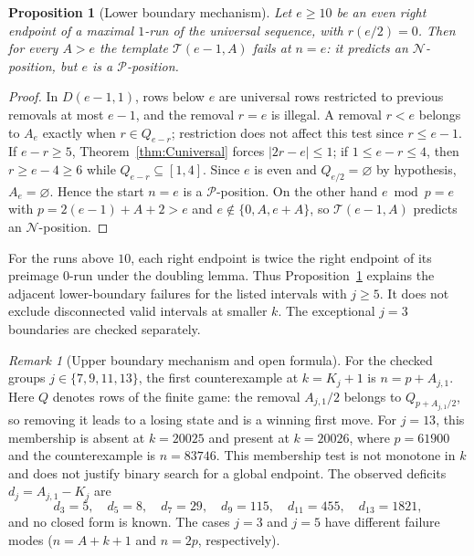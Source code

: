 \documentclass[11pt]{article}
\newtheorem{proposition}[theorem]{Proposition}
\theoremstyle{remark}
\newtheorem{remark}[theorem]{Remark}
\newcommand{\Pset}{\mathcal{P}}
\newcommand{\Nset}{\mathcal{N}}
\begin{document}
\begin{proposition}[Lower boundary mechanism]\label{prop:Ckmin}
Let $e\ge10$ be an even right endpoint of a maximal $1$-run of the universal sequence, with $r(e/2)=0$. Then for every $A>e$ the template $\mathcal{T}(e-1,A)$ fails at $n=e$: it predicts an $\Nset$-position, but $e$ is a $\Pset$-position.
\end{proposition}
\begin{proof}
In $D(e-1,1)$, rows below $e$ are universal rows restricted to previous removals at most $e-1$, and the removal $r=e$ is illegal. A removal $r<e$ belongs to $A_e$ exactly when $r\in Q_{e-r}$; restriction does not affect this test since $r\le e-1$. If $e-r\ge5$, Theorem~\ref{thm:Cuniversal} forces $|2r-e|\le1$; if $1\le e-r\le4$, then $r\ge e-4\ge6$ while $Q_{e-r}\subseteq[1,4]$. Since $e$ is even and $Q_{e/2}=\varnothing$ by hypothesis, $A_e=\varnothing$. Hence the start $n=e$ is a $\Pset$-position. On the other hand $e\bmod p=e$ with $p=2(e-1)+A+2>e$ and $e\notin\{0,A,e+A\}$, so $\mathcal{T}(e-1,A)$ predicts an $\Nset$-position.
\end{proof}

For the runs above $10$, each right endpoint is twice the right endpoint of its preimage $0$-run under the doubling lemma. Thus Proposition~\ref{prop:Ckmin} explains the adjacent lower-boundary failures for the listed intervals with $j\ge5$. It does not exclude disconnected valid intervals at smaller $k$. The exceptional $j=3$ boundaries are checked separately.

\begin{remark}[Upper boundary mechanism and open formula]\label{rem:Cupper}
For the checked groups $j\in\{7,9,11,13\}$, the first counterexample at $k=K_j+1$ is $n=p+A_{j,1}$. Here $Q$ denotes rows of the finite game: the removal $A_{j,1}/2$ belongs to $Q_{p+A_{j,1}/2}$, so removing it leads to a losing state and is a winning first move. For $j=13$, this membership is absent at $k=20025$ and present at $k=20026$, where $p=61900$ and the counterexample is $n=83746$. This membership test is not monotone in $k$ and does not justify binary search for a global endpoint. The observed deficits $d_j=A_{j,1}-K_j$ are
\[
d_3=5,\quad d_5=8,\quad d_7=29,\quad d_9=115,\quad d_{11}=455,\quad d_{13}=1821,
\]
and no closed form is known. The cases $j=3$ and $j=5$ have different failure modes ($n=A+k+1$ and $n=2p$, respectively).
\end{remark}
\end{document}
